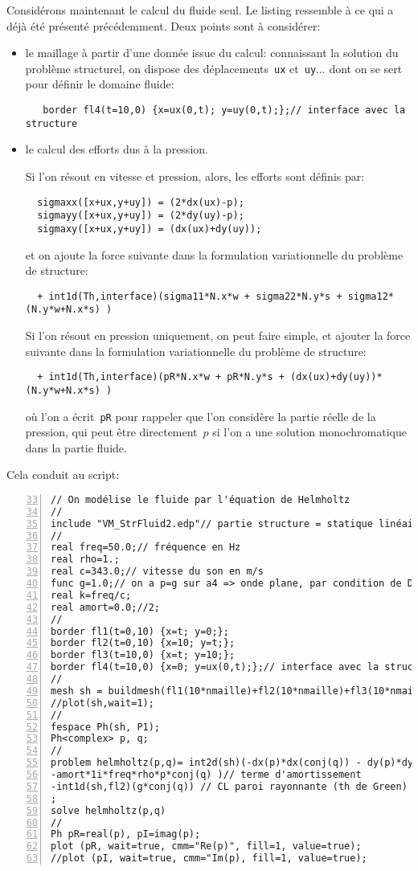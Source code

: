 \medskip
Considérons maintenant le calcul du fluide seul. Le listing ressemble à ce qui a déjà été présenté précédemment. Deux points sont à considérer:
\begin{itemize}
   \item le maillage à partir d'une donnée issue du calcul:
   connaissant la solution du problème structurel, on dispose des déplacements~\verb|ux| et~\verb|uy|... dont on se sert pour définir le domaine fluide:
   \begin{verbatim}
   border fl4(t=10,0) {x=ux(0,t); y=uy(0,t);};// interface avec la structure
   \end{verbatim}
   \item le calcul des efforts dus à la pression.
   
   Si l'on résout en vitesse et pression, alors, les efforts sont définis par:
   \begin{verbatim}
  sigmaxx([x+ux,y+uy]) = (2*dx(ux)-p);
  sigmayy([x+ux,y+uy]) = (2*dy(uy)-p);
  sigmaxy([x+ux,y+uy]) = (dx(ux)+dy(uy));
   \end{verbatim}
   et on ajoute la force suivante dans la formulation variationnelle du problème de structure:
   \begin{verbatim}
  + int1d(Th,interface)(sigma11*N.x*w + sigma22*N.y*s + sigma12*(N.y*w+N.x*s) ) 
   \end{verbatim}
   
   Si l'on résout en pression uniquement, on peut faire simple, et ajouter la force suivante dans la formulation variationnelle du problème de structure:
   \begin{verbatim}
  + int1d(Th,interface)(pR*N.x*w + pR*N.y*s + (dx(ux)+dy(uy))*(N.y*w+N.x*s) )
   \end{verbatim}
   où l'on a écrit~\verb|pR| pour rappeler que l'on considère la partie réelle de la pression, qui peut être directement~$p$ si l'on a une solution monochromatique dans la partie fluide.
\end{itemize}


\medskip
Cela conduit au script:
\scriptsize
\begin{Verbatim}[numbers=left,numbersep=3pt,firstnumber=33]
// On modélise le fluide par l'équation de Helmholtz
//
include "VM_StrFluid2.edp"// partie structure = statique linéaire isotrope
//
real freq=50.0;// fréquence en Hz
real rho=1.;
real c=343.0;// vitesse du son en m/s
func g=1.0;// on a p=g sur a4 => onde plane, par condition de Dirichlet
real k=freq/c;
real amort=0.0;//2;
//
border fl1(t=0,10) {x=t; y=0;};
border fl2(t=0,10) {x=10; y=t;};
border fl3(t=10,0) {x=t; y=10;};
border fl4(t=10,0) {x=0; y=ux(0,t);};// interface avec la structure
//
mesh sh = buildmesh(fl1(10*nmaille)+fl2(10*nmaille)+fl3(10*nmaille)+fl4(10*nmaille));
//plot(sh,wait=1);
//
fespace Ph(sh, P1);
Ph<complex> p, q;
//
problem helmholtz(p,q)= int2d(sh)(-dx(p)*dx(conj(q)) - dy(p)*dy(conj(q)) +k*k*p*conj(q) // forme bilin non amortie
-amort*1i*freq*rho*p*conj(q) )// terme d'amortissement
-int1d(sh,fl2)(g*conj(q)) // CL paroi rayonnante (th de Green)
;
solve helmholtz(p,q)
//
Ph pR=real(p), pI=imag(p);
plot (pR, wait=true, cmm="Re(p)", fill=1, value=true);
//plot (pI, wait=true, cmm="Im(p), fill=1, value=true);
\end{Verbatim}
\normalsize

